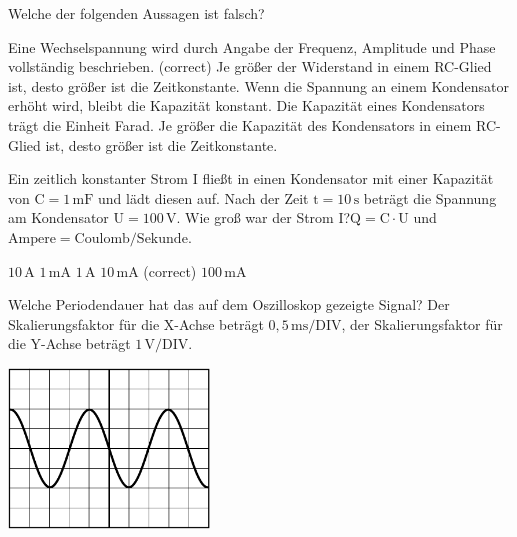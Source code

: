 \documentclass[11pt]{exam}
\begin{document}
\setlength{\voffset}{-0.5in}
\setlength{\headsep}{5pt}

\hspace{2mm}
 \hspace{5mm}
\vspace{4mm}

\begin{questions}

\question Welche der folgenden Aussagen ist falsch?

\begin{choices}
	\choice Eine Wechselspannung wird durch Angabe der Frequenz, Amplitude und Phase vollständig beschrieben. (correct)
	\choice Je größer der Widerstand in einem RC-Glied ist, desto größer ist die Zeitkonstante.
	\choice Wenn die Spannung an einem Kondensator erhöht wird, bleibt die Kapazität konstant.
	\choice Die Kapazität eines Kondensators trägt die Einheit Farad.
	\choice Je größer die Kapazität des Kondensators in einem RC-Glied ist, desto größer ist die Zeitkonstante.
\end{choices}

\vspace{3mm}\question Ein zeitlich konstanter Strom \(\mathrm{I}\) fließt in einen Kondensator mit einer Kapazität von \(\mathrm{C=1\,mF}\) und lädt diesen auf. Nach der Zeit \(\mathrm{t=10\,s}\) beträgt die Spannung am Kondensator \(\mathrm{U=100\,V}\). Wie groß war der Strom \(\mathrm{I}\)?\(\mathrm{Q=C \cdot U}\) und \(\mathrm{Ampere=Coulomb/Sekunde}\).

\begin{choices}
	\choice \(\mathrm{10\,A}\)
	\choice \(\mathrm{1\,mA}\)
	\choice \(\mathrm{1\,A}\)
	\choice \(\mathrm{10\,mA}\) (correct)
	\choice \(\mathrm{100\,mA}\)
\end{choices}

\vspace{3mm}\question Welche Periodendauer hat das auf dem Oszilloskop gezeigte Signal? Der Skalierungsfaktor für die X-Achse beträgt \(\mathrm{0,5\,ms/DIV}\), der Skalierungsfaktor für die Y-Achse beträgt \(\mathrm{1\,V/DIV}\). 

\includegraphics[width=0.4\textwidth]{images/Oszi1.png}


\end{questions}
\end{document}
